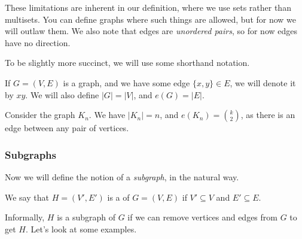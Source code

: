 \documentclass[a4paper]{scrartcl}
\begin{document}
\begin{remark}
\begin{center}

	\end{center}
	These limitations are inherent in our definition, where we use sets rather than multisets. You can define graphs where such things are allowed, but for now we will outlaw them. We also note that edges are \emph{unordered pairs}, so for now edges have no direction.
\end{remark}

To be slightly more succinct, we will use some shorthand notation. 

\begin{notation}
If $G = (V, E)$ is a graph, and we have some edge $\{x, y\} \in E$, we will denote it by $xy$. We will also define $|G| = |V|$, and $e(G) = |E|$.
\end{notation}
 
\begin{example}
	Consider the graph $K_n$. We have $|K_n| = n$, and $e(K_n) = \binom{k}{2}$, as there is an edge between any pair of vertices.
\end{example}

\subsubsection{Subgraphs}

Now we will define the notion of a \emph{subgraph}, in the natural way.

\begin{definition}[Subgraph]
	We say that $H= (V', E')$ is a  of $G = (V, E)$ if $V' \subseteq V$ and $E' \subseteq E$.
\end{definition}

Informally, $H$ is a subgraph of $G$ if we can remove vertices and edges from $G$ to get $H$. Let's look at some examples.
\end{document}
